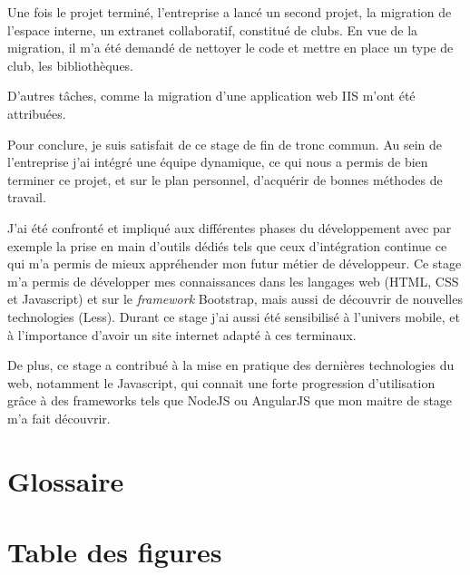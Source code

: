 \documentclass[12pt,a4paper]{article}
\begin{document}
\medskip
Une fois le projet terminé, l'entreprise a lancé un second projet, la migration de l'espace interne, un extranet collaboratif, constitué de clubs. En vue de la migration, il m'a été demandé de nettoyer le code et mettre en place un type de club, les bibliothèques. \par 
D'autres tâches, comme la migration d'une application web IIS m'ont été attribuées.\par
\medskip
Pour conclure, je suis satisfait de ce stage de fin de tronc commun. Au sein de l'entreprise j'ai intégré une équipe dynamique, ce qui nous a permis de bien terminer ce projet, et sur le plan personnel, d'acquérir de bonnes méthodes de travail.\par J'ai été confronté et impliqué aux différentes phases du développement avec par exemple la prise en main d'outils dédiés tels que ceux d'intégration continue ce qui m'a permis de mieux appréhender mon futur métier de développeur.
Ce stage m'a permis de développer mes connaissances dans les langages web (\gls{HTML}, \gls{CSS} et Javascript) et sur le \textit{framework} Bootstrap, mais aussi de découvrir de nouvelles technologies (Less). Durant ce stage j'ai aussi été sensibilisé à l'univers mobile, et à l'importance d'avoir un site internet adapté à ces terminaux.\par 
De plus, ce stage a contribué à la mise en pratique des dernières technologies du web, notamment le Javascript, qui connait une forte progression d'utilisation grâce à des frameworks tels que NodeJS ou AngularJS que mon maitre de stage m'a fait découvrir.\par

\newpage
\section{Glossaire}
\printglossaries

\section{Table des figures}
\listoffigures
\end{document}
